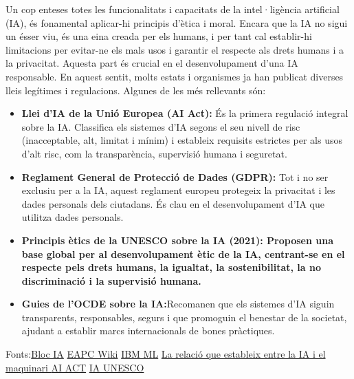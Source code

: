 {Un cop enteses totes les funcionalitats i capacitats de la intel·ligència artificial (IA), és fonamental aplicar-hi principis d’ètica i moral. Encara que la IA no sigui un ésser viu, és una eina creada per els  humans, i per tant cal establir-hi limitacions per evitar-ne els mals usos i garantir el respecte als drets humans i a la privacitat. Aquesta part és crucial en el desenvolupament d’una IA responsable. En aquest sentit, molts estats i organismes ja han publicat diverses lleis legítimes i regulacions. Algunes de les més rellevants són:
 \begin{itemize}
  \item \textbf{Llei d’IA de la Unió Europea (AI Act):} És la primera regulació integral sobre la IA. Classifica els sistemes d’IA segons el seu nivell de risc (inacceptable, alt, limitat i mínim) i estableix requisits estrictes per als usos d’alt risc, com la transparència, supervisió humana i seguretat.
  \item \textbf{Reglament General de Protecció de Dades (GDPR):} Tot i no ser exclusiu per a la IA, aquest reglament europeu protegeix la privacitat i les dades personals dels ciutadans. És clau en el desenvolupament d’IA que utilitza dades personals.
  \item \textbf{Principis ètics de la UNESCO sobre la IA (2021): Proposen una base global per al desenvolupament ètic de la IA, centrant-se en el respecte pels drets humans, la igualtat, la sostenibilitat, la no discriminació i la supervisió humana.}
  \item \textbf{Guies de l’OCDE sobre la IA:}Recomanen que els sistemes d’IA siguin transparents, responsables, segurs i que promoguin el benestar de la societat, ajudant a establir marcs internacionals de bones pràctiques.
 \end{itemize}



Fonts:\href{https://blogs.uoc.edu/digitapia/the-european-unions-artificial-intelligence-act-explained/}{Bloc IA} \href{https://formaciooberta.eapc.gencat.cat/contingutsdelscursos/tdp/080_int_artificial/inici.html}{EAPC Wiki}
\href{https://www.ibm.com/think/topics/machine-learning}{IBM ML} \href{https://www.ultralytics.com/es/blog/understanding-the-impact-of-compute-power-on-ai-innovations}{La relació que estableix entre la IA i el maquinari }\cite{bengio2012} \href{https://digital-strategy.ec.europa.eu/en/policies/regulatory-framework-ai?utm_source=chatgpt.com}{AI ACT} \href{https://www.unesco.org/en/legal-affairs/recommendation-ethics-artificial-intelligence?utm_source=chatgpt.com}{IA UNESCO}

}
